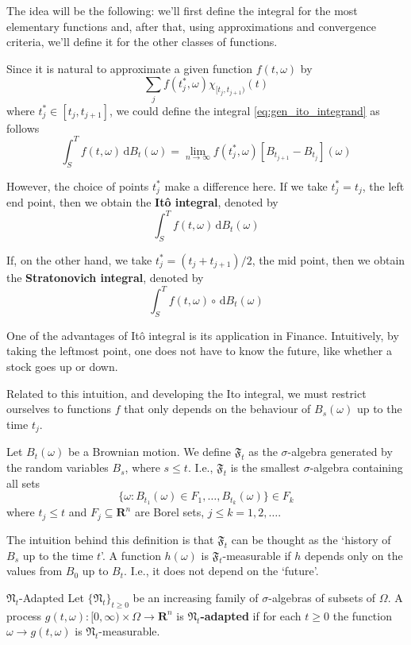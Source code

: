 The idea will be the following: we'll first define the integral for the most elementary functions and, after that, using approximations and convergence criteria, we'll define it for the other classes of functions.

Since it is natural to approximate a given function $f(t, \omega)$ by
\[
	\sum_j f(t_j^\ast, \omega) \chi_{[t_j, t_{j+1})}(t)
\]
where $t_j^\ast \in [t_j, t_{j+1}]$, we could define the integral \eqref{eq:gen_ito_integrand} as follows
\[
	\int_S^T f(t, \omega) \, \mathrm{d}B_t(\omega) = \lim_{n \to \infty} f(t_j^\ast,\omega) [B_{t_{j+1}} - B_{t_j}](\omega)
\]

However, the choice of points $t_j^\ast$ make a difference here. If we take $t_j^\ast = t_j$, the left end point, then we obtain the \textbf{Itô integral}, denoted by
\[
	\int_S^T f(t, \omega) \, \mathrm{d}B_t(\omega)
\]

If, on the other hand, we take $t_j^\ast = (t_j + t_{j+1})/2$, the mid point, then we obtain the \textbf{Stratonovich integral}, denoted by
\[
	\int_S^T f(t, \omega) \circ \, \mathrm{d}B_t(\omega)
\]

One of the advantages of Itô integral is its application in Finance. Intuitively, by taking the leftmost point, one does not have to know the future, like whether a stock goes up or down.

Related to this intuition, and developing the Ito integral, we must restrict ourselves to functions $f$ that only depends on the behaviour of $B_s(\omega)$ up to the time $t_j$. 

\begin{definition}[]{}{}
	Let $B_t(\omega)$ be a Brownian motion. We define $\mathfrak{F}_t$ as the $\sigma$-algebra generated by the random variables $B_s$, where $s \leq t$. I.e., $\mathfrak{F}_t$ is the smallest $\sigma$-algebra containing all sets
	\[
		\{ \omega : B_{t_1}(\omega) \in F_1, \ldots, B_{t_k}(\omega) \} \in F_k
	\]
	where $t_j \leq t$ and $F_j \subseteq \textbf{R}^n$ are Borel sets, $j \leq k = 1, 2, \ldots$.
\end{definition}

The intuition behind this definition is that $\mathfrak{F}_t$ can be thought as the `history of $B_s$ up to the time $t$'. A function $h(\omega)$ is $\mathfrak{F}_t$-measurable if $h$ depends only on the values from $B_0$ up to $B_t$. I.e., it does not depend on the `future'. 

\begin{definition}[]{$\mathfrak{N}_t$-Adapted}{}
	Let $\{ \mathfrak{N}_t \}_{t \geq 0}$ be an increasing family of $\sigma$-algebras of subsets of $\Omega$. A process $g(t,\omega) : [0, \infty) \times \Omega \longrightarrow \textbf{R}^n$ is \textbf{$\mathfrak{N}_t$-adapted} if for each $t \geq 0$ the function $\omega \longrightarrow g(t,\omega)$ is $\mathfrak{N}_t$-measurable.
\end{definition}


